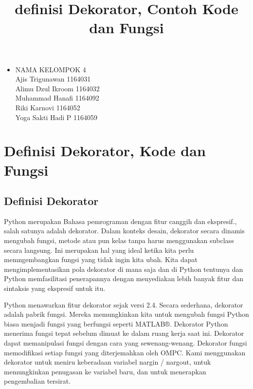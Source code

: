 \documentclass[12pt,a4paper]{article}
\begin{document}
\title{definisi Dekorator, Contoh Kode dan Fungsi}

\maketitle



\begin{itemize}



\item

NAMA KELOMPOK 4\\

Ajis Trigunawan			1164031\\

Alimu Dzul Ikroom		1164032\\

Muhammad Hanafi			1164092\\

Riki Karnovi			1164052\\

Yoga Sakti Hadi P		1164059\\



\end{itemize}



\section{Definisi Dekorator, Kode dan Fungsi}



\subsection{Definisi Dekorator}

Python merupakan Bahasa pemrograman dengan fitur canggih dan ekspresif., salah satunya adalah dekorator. Dalam konteks desain, dekorator secara dinamis mengubah fungsi, metode atau pun kelas tanpa harus menggunakan subclass secara langsung. Ini merupakan hal yang ideal ketika kita perlu memngembangkan fungsi yang tidak ingin kita ubah. Kita dapat mengimplementasikan pola dekorator di mana saja dan di Python tentunya  dan Python memfasilitasi penerapannya dengan menyediakan lebih banyak fitur dan sintaksis yang ekspresif untuk itu. 



Python menawarkan fitur dekorator sejak versi 2.4. Secara sederhana, dekorator adalah pabrik fungsi. Mereka memungkinkan kita untuk mengubah fungsi Python biasa menjadi fungsi yang berfungsi seperti MATLAB®. Dekorator Python menerima fungsi tepat sebelum dimuat ke dalam ruang kerja saat ini. Dekorator dapat memanipulasi fungsi dengan cara yang sewenang-wenang. Dekorator fungsi memodifikasi setiap fungsi yang diterjemahkan oleh OMPC. Kami menggunakan dekorator untuk meniru keberadaan variabel nargin / nargout, untuk memungkinkan penugasan ke variabel baru, dan untuk menerapkan pengembalian tersirat.
\end{document}
